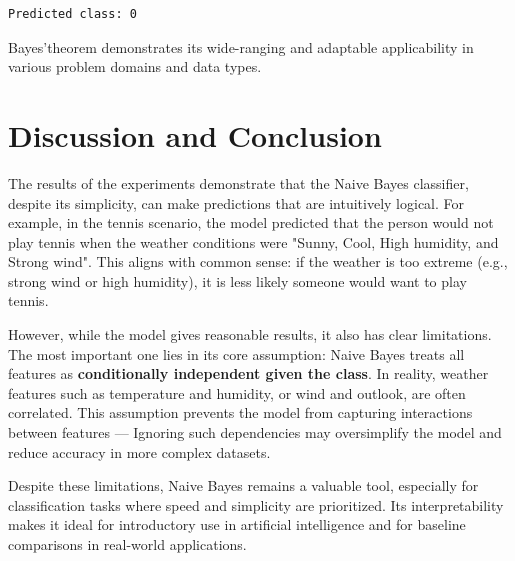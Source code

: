 \documentclass{article}
\begin{document}
\begin{lstlisting}
Predicted class: 0
\end{lstlisting}


Bayes'theorem demonstrates its wide-ranging and adaptable applicability in various problem domains and data types.


\section*{Discussion and Conclusion}

The results of the experiments demonstrate that the Naive Bayes classifier, despite its simplicity,
can make predictions that are intuitively logical. For example, in the tennis scenario,
the model predicted that the person would not play tennis when the weather conditions were "Sunny, Cool, High humidity, and Strong wind".
This aligns with common sense: if the weather is too extreme (e.g., strong wind or high humidity),
 it is less likely someone would want to play tennis.

However, while the model gives reasonable results, it also has clear limitations.
The most important one lies in its core assumption: Naive Bayes treats all features as \textbf{conditionally independent given the class}.
In reality, weather features such as temperature and humidity, or wind and outlook, are often correlated.
This assumption prevents the model from capturing interactions between features —
Ignoring such dependencies may oversimplify the model and reduce accuracy in more complex datasets.

Despite these limitations, Naive Bayes remains a valuable tool, especially for classification tasks where speed and simplicity are prioritized.
Its interpretability makes it ideal for introductory use in artificial intelligence and for baseline comparisons in real-world applications.
\end{document}
